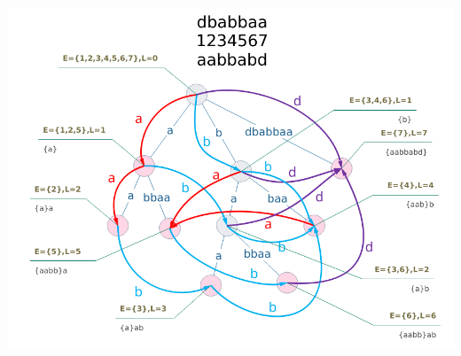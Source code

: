 \documentclass[9pt]{ctexart}
\begin{document}
\begin{landscape}
\begin{multicols}{2}
\end{multicols}

\begin{center}
\includegraphics[width=0.8\linewidth]{assets/sam.png}
\end{center}

\end{landscape}
\end{document}
